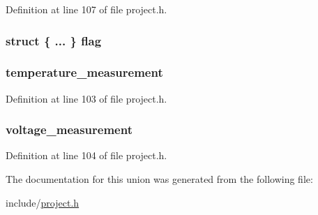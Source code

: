 \-Definition at line 107 of file project.\-h.

\hypertarget{unions__request__flags_aa7856aa1edd0e3f26421a3283901e2e7}{
\subsubsection[{flag}]{\setlength{\rightskip}{0pt plus 5cm}struct \{ ... \}   {\bf flag}}}\label{unions__request__flags_aa7856aa1edd0e3f26421a3283901e2e7}
\hypertarget{unions__request__flags_a851b146818d28e82773d793261389b80}{
\subsubsection[{temperature\-\_\-measurement}]{ {\bf temperature\-\_\-measurement}}}\label{unions__request__flags_a851b146818d28e82773d793261389b80}


\-Definition at line 103 of file project.\-h.

\hypertarget{unions__request__flags_a34ac0ac4c8f59b9ed016337d132c0961}{
\subsubsection[{voltage\-\_\-measurement}]{ {\bf voltage\-\_\-measurement}}}\label{unions__request__flags_a34ac0ac4c8f59b9ed016337d132c0961}


\-Definition at line 104 of file project.\-h.



\-The documentation for this union was generated from the following file\-:\begin{DoxyCompactItemize}
\item 
include/\hyperlink{project_8h}{project.\-h}\end{DoxyCompactItemize}
